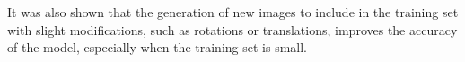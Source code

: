 \documentclass[journal]{IEEEtran}
\begin{document}
It was also shown that the generation of new images to include in the training set with slight modifications, such as rotations or translations, improves the accuracy of the model, especially when the training set is small.




%








\end{document}

